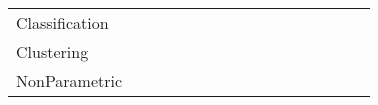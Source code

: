 \begin{tabular}{llllllllllllllll}
Classification       &                  &                    &                     &                    &                      &                         &                   &             &                   &                 &                    &                           &                       &                         &                     \\
Clustering           &                  &                    &                     &                    &                      &                         &                   &             &                   &                 &                    &                           &                       &                         &                     \\
NonParametric        &                  &                    &                     &                    &                      &                         &                   &             &                   &                 &                    &                           &                       &                         &                     \\
\bottomrule
\end{tabular}
